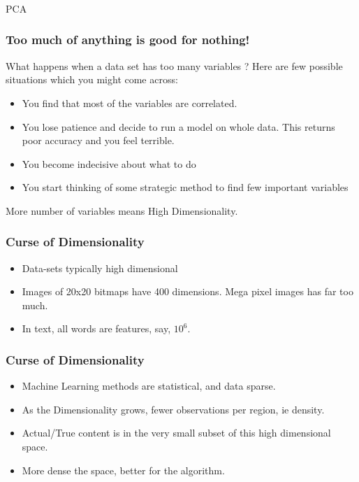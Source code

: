 \begin{frame}[fragile]\frametitle{}
\begin{center}
{\Large PCA}
\end{center}
\end{frame}

\begin{frame}[fragile]\frametitle{ Too much of anything is good for nothing!}
What happens when a data set has too many variables ? Here are few possible situations which you might come across:
\begin{itemize}
\item  You find that most of the variables are correlated.
\item  You lose patience and decide to run a model on whole data. This returns poor accuracy and you feel terrible.
\item  You become indecisive about what to do
\item  You start thinking of some strategic method to find few important variables
\end{itemize}

More number of variables means High Dimensionality.

\end{frame}



\begin{frame}[fragile]\frametitle{Curse	of Dimensionality}
\begin{itemize}
\item  Data-sets typically high dimensional	
 \item Images of 20x20 bitmaps have 400 dimensions. Mega pixel images has far too much.
 \item In text, all words are features, say, $10^6$.
\end{itemize}
\end{frame}


\begin{frame}[fragile]\frametitle{Curse	of Dimensionality}
\begin{itemize}
 \item Machine Learning methods are statistical, and data sparse.
 \item As the Dimensionality grows, fewer observations per region, ie density.
 \item Actual/True content is in the very small subset of this high dimensional space.
 \item More dense the space, better for the algorithm.
\end{itemize}
\end{frame}



